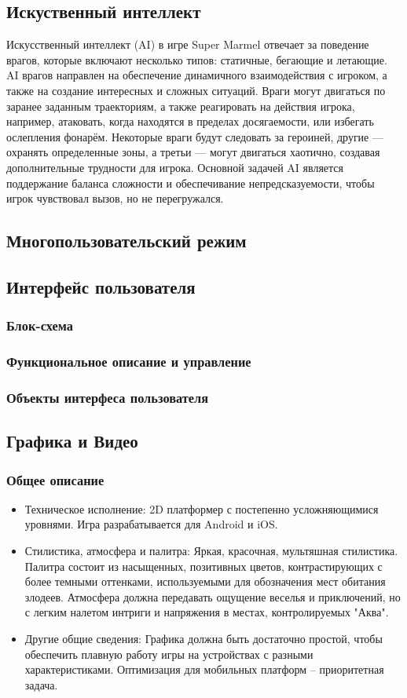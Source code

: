 \documentclass[article,12pt, fleqn]{article}
\begin{document}
\begin{itemize}
\subsection{Искуственный интеллект}
Искусственный интеллект (AI) в игре Super Marmel отвечает за поведение врагов, которые включают несколько типов: статичные, бегающие и летающие. AI врагов направлен на обеспечение динамичного взаимодействия с игроком, а также на создание интересных и сложных ситуаций. Враги могут двигаться по заранее заданным траекториям, а также реагировать на действия игрока, например, атаковать, когда находятся в пределах досягаемости, или избегать ослепления фонарём. Некоторые враги будут следовать за героиней, другие — охранять определенные зоны, а третьи — могут двигаться хаотично, создавая дополнительные трудности для игрока. Основной задачей AI является поддержание баланса сложности и обеспечивание непредсказуемости, чтобы игрок чувствовал вызов, но не перегружался.

\subsection{Многопользовательский режим}
\subsection{Интерфейс пользователя}
\subsubsection{Блок-схема}
\subsubsection{Функциональное описание и управление}
\subsubsection{Объекты интерфеса пользователя}
\subsection{Графика и Видео}
\subsubsection{Общее описание}
\begin{itemize}
    \item Техническое исполнение: 
            2D платформер с постепенно усложняющимися уровнями. Игра разрабатывается для Android и iOS.
    \item Стилистика, атмосфера и палитра: 
            Яркая, красочная, мультяшная стилистика. Палитра состоит из насыщенных, позитивных цветов, контрастирующих с более темными оттенками, используемыми для обозначения мест обитания злодеев. Атмосфера должна передавать ощущение веселья и приключений, но с легким налетом интриги и напряжения в местах, контролируемых "Аква".
    \item Другие общие сведения: 
            Графика должна быть достаточно простой, чтобы обеспечить плавную работу игры на устройствах с разными характеристиками. Оптимизация для мобильных платформ – приоритетная задача.
\end{itemize}

\end{itemize}
\end{document}
